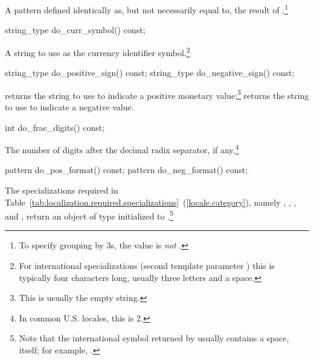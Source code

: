 \begin{itemdescr}
\pnum
\returns
A pattern defined identically as, but not necessarily equal to, the result of
.\footnote{To specify grouping by 3s,
the value is 
\textit{not}
.}
\end{itemdescr}

%
\begin{itemdecl}
string_type do_curr_symbol() const;
\end{itemdecl}

\begin{itemdescr}
\pnum
\returns
A string to use as the currency identifier symbol.\footnote{For international
specializations (second template parameter
)
this is typically four characters long, usually three letters and a space.}
\end{itemdescr}

%
%
\begin{itemdecl}
string_type do_positive_sign() const;
string_type do_negative_sign() const;
\end{itemdecl}

\begin{itemdescr}
\pnum
\returns
{}
returns the string to use to indicate a
positive monetary value;\footnote{This is usually the empty string.}
returns the string to use to indicate a negative value.
\end{itemdescr}

%
\begin{itemdecl}
int do_frac_digits() const;
\end{itemdecl}

\begin{itemdescr}
\pnum
\returns
The number of digits after the decimal radix separator, if any.\footnote{In
common U.S. locales, this is 2.}
\end{itemdescr}

%
%
\begin{itemdecl}
pattern do_pos_format() const;
pattern do_neg_format() const;
\end{itemdecl}

\begin{itemdescr}
\pnum
\returns
The specializations required in Table~\ref{tab:localization.required.specializations}~(\ref{locale.category}), namely
,
,
,
and
,
return an object of type
initialized to
.\footnote{Note that the international
symbol returned by
usually contains a space, itself;
for example, .}
\end{itemdescr}

